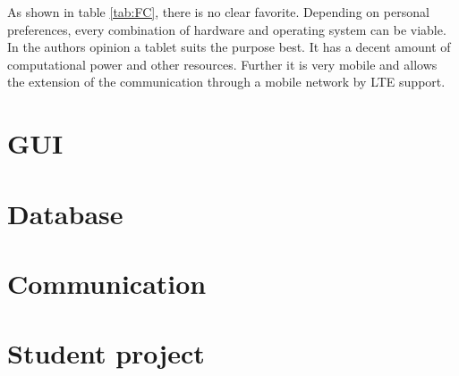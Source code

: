 \documentclass[]{scrreprt}
\begin{document}
	As shown in table \ref{tab:FC}, there is no clear favorite. Depending on personal preferences, every combination of hardware and operating system can be viable. In the authors opinion a tablet suits the purpose best. It has a decent amount of computational power and other resources. Further it is very mobile and allows the extension of the communication through a mobile network by LTE support.
	
	
	

\chapter{GUI}
\chapter{Database}
\chapter{Communication}
\chapter{Student project}

	
\end{document}
